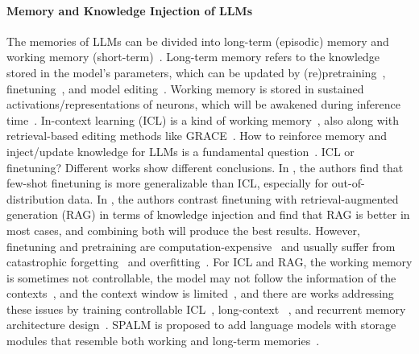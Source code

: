 \documentclass{article}
\begin{document}
\paragraph{Memory and Knowledge Injection of LLMs} 
The memories of LLMs can be divided into long-term (episodic) memory and working memory (short-term)~\cite{llm_controllable_working_memory,memoria,spalm}. Long-term memory refers to the knowledge stored in the model's parameters, which can be updated by (re)pretraining~\cite{gpt-1}, finetuning~\cite{lora}, and model editing~\cite{knowledge_editing_survey_1}. Working memory is stored in sustained activations/representations of neurons, which will be awakened during inference time~\cite{llm_controllable_working_memory}. In-context learning (ICL) is a kind of working memory~\cite{chain_of_thoughts}, also along with retrieval-based editing methods like GRACE~\cite{grace}. 
How to reinforce memory and inject/update knowledge for LLMs is a fundamental question~\cite{memoryllm,ft_vs_rag,fewshotft_vs_icl}. ICL or finetuning? Different works show different conclusions. In \cite{fewshotft_vs_icl}, the authors find that few-shot finetuning is more generalizable than ICL, especially for out-of-distribution data. In \cite{ft_vs_rag}, the authors contrast finetuning with retrieval-augmented generation (RAG) in terms of knowledge injection and find that RAG is better in most cases, and combining both will produce the best results. 
However, finetuning and pretraining are computation-expensive~\cite{llama-2,grace} and usually suffer from catastrophic forgetting~\cite{catastrophic_forgetting_llm} and overfitting~\cite{memorization_overfitting}. For ICL and RAG, the working memory is sometimes not controllable, the model may not follow the information of the contexts~\cite{llm_controllable_working_memory}, and the context window is limited~\cite{landmark_attention,infini_attention}, and there are works addressing these issues by training controllable ICL~\cite{llm_controllable_working_memory}, long-context ~\cite{landmark_attention,infini_attention}, and recurrent memory architecture design~\cite{memoryllm}. 
SPALM is proposed to add language models with storage modules that resemble both working and long-term memories~\cite{spalm}. 
\end{document}
